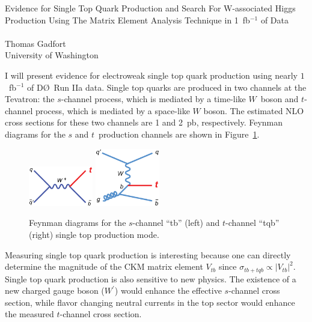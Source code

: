 \documentclass [10pt, twoside] {article}
\newcommand{\dzero} 	{\mbox{D\O}}
\begin{document}
\begin{center}
\large{Evidence for Single Top Quark Production and Search For W-associated Higgs Production
Using The Matrix Element Analysis Technique in 1~fb$^{-1}$ of Data}\\~\\
Thomas Gadfort\\
University of Washington\\
\end{center}
 
I will present evidence for electroweak single top quark production using nearly $1$~fb$^{-1}$ of $\dzero$~Run IIa data. Single top quarks are produced in two channels at the Tevatron: the $s$-channel process, which is mediated by a time-like $W$~boson and $t$-channel process, which is mediated by a space-like $W$ boson. The estimated NLO cross sections for these two channels are 1 and 2~pb, respectively. Feynman diagrams for the $s$ and $t$~production channels are shown in Figure~\ref{singletop}.

\begin{figure}[!h!tbp]
\begin{center}
\includegraphics[width=0.25\textwidth]{eps/Theory/feynman_tb_note.eps}
\includegraphics[width=0.25\textwidth]{eps/Theory/feynman_tqb_note.eps}
\end{center}
\caption{Feynman diagrams for the $s$-channel ``tb'' (left) and $t$-channel ``tqb'' (right) single top production mode.}
\label{singletop}
\end{figure}

Measuring single top quark production is interesting because one can directly determine the magnitude of the CKM matrix element $V_{tb}$ since $\sigma_{tb+tqb}\propto|V_{tb}|^{2}$. Single top quark production is also sensitive to new physics. The existence of a new charged gauge boson ($W^{'}$) would enhance the effective $s$-channel cross section, while flavor changing neutral currents in the top sector would enhance the measured $t$-channel cross section.
\end{document}
